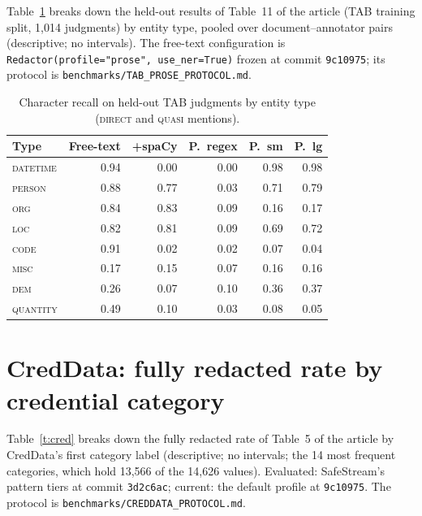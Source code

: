 \documentclass[11pt,a4paper]{article}
\begin{document}
Table~\ref{t:tabtrain} breaks down the held-out results of Table~11 of the article (TAB training split, 1,014 judgments) by entity type, pooled over document--annotator pairs (descriptive; no intervals). The free-text configuration is \texttt{Redactor(profile="prose", use\_ner=True)} frozen at commit \texttt{9c10975}; its protocol is \texttt{benchmarks/TAB\_PROSE\_PROTOCOL.md}.

\begin{table}[ht]
\caption{Character recall on held-out TAB judgments by entity type (\textsc{direct} and \textsc{quasi} mentions).}\label{t:tabtrain}
\small
\begin{tabular*}{\textwidth}{@{\extracolsep\fill}lrrrrr}
\toprule
Type & Free-text & +spaCy & P.\ regex & P.\ sm & P.\ lg \\
\midrule
\textsc{datetime} & 0.94 & 0.00 & 0.00 & 0.98 & 0.98 \\
\textsc{person} & 0.88 & 0.77 & 0.03 & 0.71 & 0.79 \\
\textsc{org} & 0.84 & 0.83 & 0.09 & 0.16 & 0.17 \\
\textsc{loc} & 0.82 & 0.81 & 0.09 & 0.69 & 0.72 \\
\textsc{code} & 0.91 & 0.02 & 0.02 & 0.07 & 0.04 \\
\textsc{misc} & 0.17 & 0.15 & 0.07 & 0.16 & 0.16 \\
\textsc{dem} & 0.26 & 0.07 & 0.10 & 0.36 & 0.37 \\
\textsc{quantity} & 0.49 & 0.10 & 0.03 & 0.08 & 0.05 \\
\bottomrule
\end{tabular*}
\end{table}

\section{CredData: fully redacted rate by credential category}\label{s:cred}

Table~\ref{t:cred} breaks down the fully redacted rate of Table~5 of the article by CredData's first category label (descriptive; no intervals; the 14 most frequent categories, which hold 13,566 of the 14,626 values). Evaluated: SafeStream's pattern tiers at commit \texttt{3d2c6ac}; current: the default profile at \texttt{9c10975}. The protocol is \texttt{benchmarks/CREDDATA\_PROTOCOL.md}.
\end{document}

